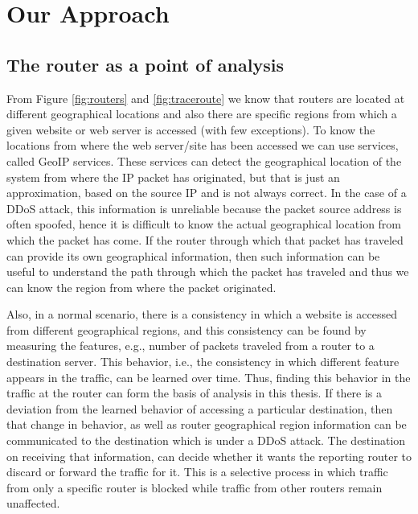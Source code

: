 \documentclass[12pt,oneside,a4paper]{article}
\begin{document}
\section{Our Approach}

\subsection{The router as a point of analysis}
From Figure \ref{fig:routers} and \ref{fig:traceroute} we know that routers are located at different geographical locations and also there are specific regions from which a given website or web server is accessed (with few exceptions). To know the locations from where the web server/site has been accessed we can use services, called GeoIP services. These services can detect the geographical location of the system from where the IP packet has originated, but that is just an approximation, based on the source IP and is not always correct. In the case of a DDoS attack, this information is unreliable because the packet source address is often spoofed, hence it is difficult to know the actual geographical location from which the packet has come. If the router through which that packet has traveled can provide its own geographical information, then such information can be useful to understand the path through which the packet has traveled and thus we can know the region from where the packet originated.\par

Also, in a normal scenario, there is a consistency in which a website is accessed from different geographical regions, and this consistency can be found by measuring the features, e.g., number of packets traveled from a router to a destination server. This behavior, i.e., the consistency in which different feature appears in the traffic, can be learned over time. Thus, finding this behavior in the traffic at the router can form the basis of analysis in this thesis. If there is a deviation from the learned behavior of accessing a particular destination, then that change in behavior, as well as router geographical region information can be communicated to the destination which is under a DDoS attack. The destination on receiving that information, can decide whether it wants the reporting router to discard or forward the traffic for it. This is a selective process in which traffic from only a specific router is blocked while traffic from other routers remain unaffected.
\end{document}
